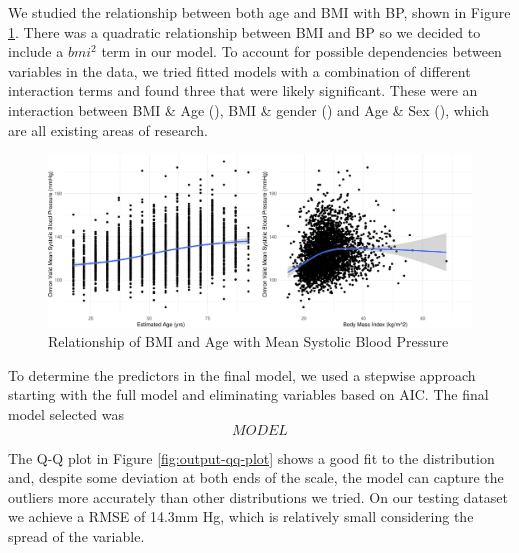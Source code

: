 \documentclass[
  11pt,
  twocolumn]{article}
\begin{document}
We studied the relationship between both age and BMI with BP, shown in
Figure \ref{fig:output-relationship-plots}. There was a quadratic
relationship between BMI and BP so we decided to include a \(bmi^2\)
term in our model. To account for possible dependencies between
variables in the data, we tried fitted models with a combination of
different interaction terms and found three that were likely
significant. These were an interaction between BMI \& Age
(), BMI \& gender
() and Age \& Sex
(), which are all existing areas of
research.

\begin{figure}[H]
\includegraphics{Coursework_files/figure-latex/output-relationship-plots-1} \caption{Relationship of BMI and Age with Mean Systolic Blood Pressure}\label{fig:output-relationship-plots}
\end{figure}

To determine the predictors in the final model, we used a stepwise
approach starting with the full model and eliminating variables based on
AIC. The final model selected was \[MODEL\]

The Q-Q plot in Figure \ref{fig:output-qq-plot} shows a good fit to the
distribution and, despite some deviation at both ends of the scale, the
model can capture the outliers more accurately than other distributions
we tried. On our testing dataset we achieve a RMSE of 14.3mm Hg, which
is relatively small considering the spread of the variable.
\end{document}
